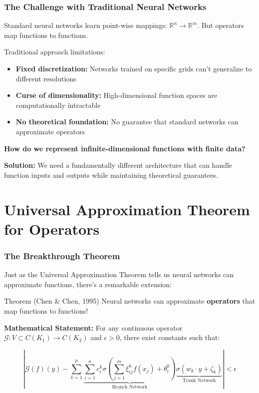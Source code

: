 \documentclass[notes]{beamer}
\begin{document}
\begin{frame}
\frametitle{The Challenge with Traditional Neural Networks}

Standard neural networks learn point-wise mappings: $\mathbb{R}^n \rightarrow \mathbb{R}^m$. But operators map functions to functions.

\begin{alertblock}{Traditional approach limitations:}
\begin{itemize}
    \item \textbf{Fixed discretization:} Networks trained on specific grids can't generalize to different resolutions
    \item \textbf{Curse of dimensionality:} High-dimensional function spaces are computationally intractable
    \item \textbf{No theoretical foundation:} No guarantee that standard networks can approximate operators
\end{itemize}
\end{alertblock}

\textbf{How do we represent infinite-dimensional functions with finite data?}

\vspace{0.5cm}

\textbf{Solution:} We need a fundamentally different architecture that can handle function inputs and outputs while maintaining theoretical guarantees.

\end{frame}

\section{Universal Approximation Theorem for Operators}

\begin{frame}
\frametitle{The Breakthrough Theorem}

Just as the Universal Approximation Theorem tells us neural networks can approximate functions, there's a remarkable extension:

\begin{block}{Theorem (Chen \& Chen, 1995)}
Neural networks can approximate \textbf{operators} that map functions to functions!
\end{block}

\textbf{Mathematical Statement:} For any continuous operator $\mathcal{G}: V \subset C(K_1) \rightarrow C(K_2)$ and $\epsilon > 0$, there exist constants such that:

\begin{equation*}
\left|\mathcal{G}(f)(y) - \sum_{k=1}^p \underbrace{\sum_{i=1}^n c_i^k \sigma\left(\sum_{j=1}^m \xi_{ij}^k f(x_j) + \theta_i^k\right)}_{\text{Branch Network}} \underbrace{\sigma(w_k \cdot y + \zeta_k)}_{\text{Trunk Network}}\right| < \epsilon
\end{equation*}

\end{frame}
\end{document}
